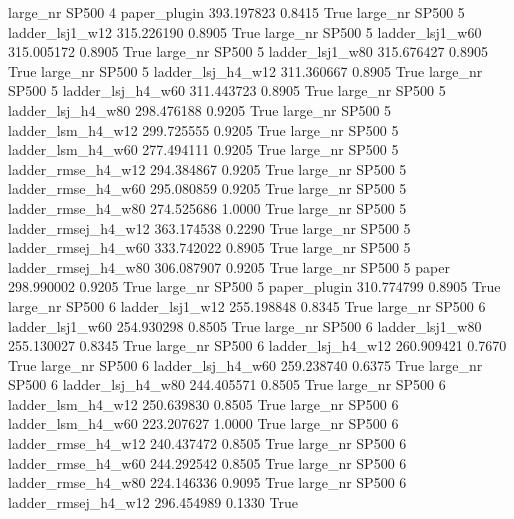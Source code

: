   large_nr    SP500                 4        paper_plugin  393.197823      0.8415    True
  large_nr    SP500                 5     ladder_lsj1_w12  315.226190      0.8905    True
  large_nr    SP500                 5     ladder_lsj1_w60  315.005172      0.8905    True
  large_nr    SP500                 5     ladder_lsj1_w80  315.676427      0.8905    True
  large_nr    SP500                 5   ladder_lsj_h4_w12  311.360667      0.8905    True
  large_nr    SP500                 5   ladder_lsj_h4_w60  311.443723      0.8905    True
  large_nr    SP500                 5   ladder_lsj_h4_w80  298.476188      0.9205    True
  large_nr    SP500                 5   ladder_lsm_h4_w12  299.725555      0.9205    True
  large_nr    SP500                 5   ladder_lsm_h4_w60  277.494111      0.9205    True
  large_nr    SP500                 5  ladder_rmse_h4_w12  294.384867      0.9205    True
  large_nr    SP500                 5  ladder_rmse_h4_w60  295.080859      0.9205    True
  large_nr    SP500                 5  ladder_rmse_h4_w80  274.525686      1.0000    True
  large_nr    SP500                 5 ladder_rmsej_h4_w12  363.174538      0.2290    True
  large_nr    SP500                 5 ladder_rmsej_h4_w60  333.742022      0.8905    True
  large_nr    SP500                 5 ladder_rmsej_h4_w80  306.087907      0.9205    True
  large_nr    SP500                 5               paper  298.990002      0.9205    True
  large_nr    SP500                 5        paper_plugin  310.774799      0.8905    True
  large_nr    SP500                 6     ladder_lsj1_w12  255.198848      0.8345    True
  large_nr    SP500                 6     ladder_lsj1_w60  254.930298      0.8505    True
  large_nr    SP500                 6     ladder_lsj1_w80  255.130027      0.8345    True
  large_nr    SP500                 6   ladder_lsj_h4_w12  260.909421      0.7670    True
  large_nr    SP500                 6   ladder_lsj_h4_w60  259.238740      0.6375    True
  large_nr    SP500                 6   ladder_lsj_h4_w80  244.405571      0.8505    True
  large_nr    SP500                 6   ladder_lsm_h4_w12  250.639830      0.8505    True
  large_nr    SP500                 6   ladder_lsm_h4_w60  223.207627      1.0000    True
  large_nr    SP500                 6  ladder_rmse_h4_w12  240.437472      0.8505    True
  large_nr    SP500                 6  ladder_rmse_h4_w60  244.292542      0.8505    True
  large_nr    SP500                 6  ladder_rmse_h4_w80  224.146336      0.9095    True
  large_nr    SP500                 6 ladder_rmsej_h4_w12  296.454989      0.1330    True
